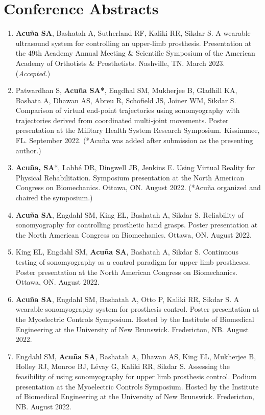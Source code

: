 \documentclass[letterpaper, 10pt]{article}
\begin{document}
\section{Conference Abstracts}
\begin{enumerate}
    \item \textbf{Acuña SA}, Bashatah A, Sutherland RF, Kaliki RR, Sikdar S. A wearable ultrasound system for controlling an upper-limb prosthesis. Presentation at the 49th Academy Annual Meeting \& Scientiﬁc Symposium of the American Academy of Orthotists \& Prosthetists. Nashville, TN. March 2023. (\textit{Accepted.})
    \item Patwardhan S, \textbf{Acuña SA*}, Engdhal SM, Mukherjee B, Gladhill KA, Bashata A, Dhawan AS, Abreu R, Schofield JS, Joiner WM,  Sikdar S. Comparison of virtual end-point trajectories using sonomyography with trajectories derived from coordinated multi-joint movements. Poster presentation at the Military Health System Research Symposium. Kissimmee, FL. September 2022. (*Acuña was added after submission as the presenting author.)
    \item \textbf{Acuña, SA}*, Labbé DR, Dingwell JB, Jenkins E. Using Virtual Reality for Physical Rehabilitation. Symposium presentation at the North American Congress on Biomechanics. Ottawa, ON. August 2022. (*Acuña organized and chaired the symposium.)
    \item \textbf{Acuña SA}, Engdahl SM, King EL, Bashatah A, Sikdar S. Reliability of sonomyography for controlling prosthetic hand grasps. Poster presentation at the North American Congress on Biomechanics. Ottawa, ON. August 2022.
    \item King EL, Engdahl SM, \textbf{Acuña SA}, Bashatah A, Sikdar S. Continuous testing of sonomyography as a control paradigm for upper limb prostheses. Poster presentation at the North American Congress on Biomechanics. Ottawa, ON. August 2022.
    \item \textbf{Acuña SA}, Engdahl SM, Bashatah A, Otto P, Kaliki RR, Sikdar S. A wearable sonomyography system for prosthesis control. Poster presentation at the Myoelectric Controls Symposium. Hosted by the Institute of Biomedical Engineering at the University of New Brunswick. Fredericton, NB. August 2022.
    \item Engdahl SM, \textbf{Acuña SA}, Bashatah A, Dhawan AS, King EL, Mukherjee B, Holley RJ, Monroe BJ, Lévay G, Kaliki RR, Sikdar S. Assessing the feasibility of using sonomyography for upper limb prosthesis control. Podium presentation at the Myoelectric Controls Symposium. Hosted by the Institute of Biomedical Engineering at the University of New Brunswick. Fredericton, NB. August 2022.

\end{enumerate}
\end{document}
